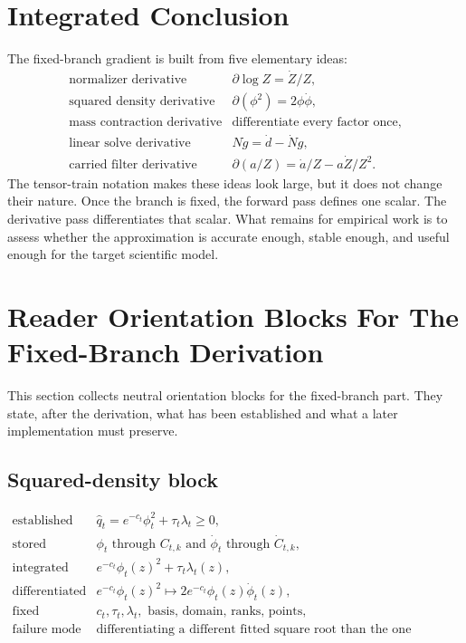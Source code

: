 \documentclass[11pt]{article}
\numberwithin{equation}{section}
\begin{document}
\section{Integrated Conclusion}

The fixed-branch gradient is built from five elementary ideas:
\begin{equation}
\begin{array}{ll}
\text{normalizer derivative} & \partial\log Z=\dot Z/Z,\\[2mm]
\text{squared density derivative} & \partial(\phi^2)=2\phi\dot\phi,\\[2mm]
\text{mass contraction derivative} & \text{differentiate every factor once},\\[2mm]
\text{linear solve derivative} & N\dot g=\dot d-\dot N g,\\[2mm]
\text{carried filter derivative} & \partial(a/Z)=\dot a/Z-a\dot Z/Z^2.
\end{array}
\label{eq:p24-p19-110}
\end{equation}
The tensor-train notation makes these ideas look large, but it does not change
their nature.  Once the branch is fixed, the forward pass defines one scalar.
The derivative pass differentiates that scalar.  What remains for empirical
work is to assess whether the approximation is accurate enough, stable enough,
and useful enough for the target scientific model.

\section{Reader Orientation Blocks For The Fixed-Branch Derivation}

This section collects neutral orientation blocks for the fixed-branch part.
They state, after the derivation, what has
been established and what a later implementation must preserve.

\subsection*{Squared-density block}

\begin{equation}
\begin{array}{ll}
\text{established} &
    \widehat q_t=e^{-c_t}\phi_t^2+\tau_t\lambda_t\ge0,\\[1mm]
\text{stored} &
    \phi_t \text{ through } C_{t,k}
    \text{ and } \dot\phi_t \text{ through } \dot C_{t,k},\\[1mm]
\text{integrated} &
    e^{-c_t}\phi_t(z)^2+\tau_t\lambda_t(z),\\[1mm]
\text{differentiated} &
    e^{-c_t}\phi_t(z)^2
    \mapsto 2e^{-c_t}\phi_t(z)\dot\phi_t(z),\\[1mm]
\text{fixed} &
    c_t,\tau_t,\lambda_t,\text{ basis, domain, ranks, points},\\[1mm]
\text{failure mode} &
    \text{differentiating a different fitted square root than the one squared.}
\end{array}
\label{eq:p24-p22-r1}
\end{equation}
\end{document}
